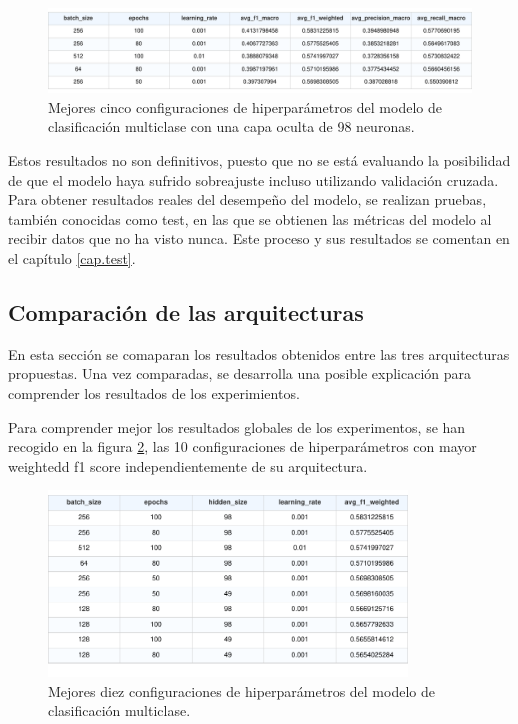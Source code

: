 \begin{figure}[H]
    \centering
    \includegraphics[width=1\textwidth]{./img/modelo/MULhs98.pdf}
    \caption{Mejores cinco configuraciones de hiperparámetros del modelo de clasificación multiclase con una capa oculta de 98 neuronas.}
    \label{fig:MULhs98}
\end{figure}

Estos resultados no son definitivos, puesto que no se está evaluando la posibilidad de que el modelo haya sufrido sobreajuste incluso utilizando validación cruzada. Para obtener resultados reales del desempeño del modelo, se realizan pruebas, también conocidas como test, en las que se obtienen las métricas del modelo al recibir datos que no ha visto nunca. Este proceso y sus resultados se comentan en el capítulo \ref{cap.test}.


\subsection{Comparación de las arquitecturas}\label{sec:comp.MUL}
En esta sección se comaparan los resultados obtenidos entre las tres arquitecturas propuestas. Una vez comparadas, se desarrolla una posible explicación para comprender los resultados de los experimientos.

Para comprender mejor los resultados globales de los experimentos, se han recogido en la figura \ref{fig:MULtop10}, las 10 configuraciones de hiperparámetros con mayor weightedd f1 score independientemente de su arquitectura.

\begin{figure}[H]
    \centering
    \includegraphics[width=0.85\textwidth]{./img/modelo/MULtop10.pdf}
    \caption{Mejores diez configuraciones de hiperparámetros del modelo de clasificación multiclase.}
    \label{fig:MULtop10}
\end{figure}

